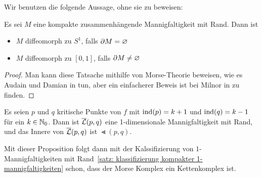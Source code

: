 Wir benutzen die folgende Aussage, ohne sie zu beweisen:

\begin{theorem}
    \label{satz: klassifizierung kompakter 1-mannigfaltigkeiten}
    Es sei $M$ eine kompakte zusammenhängende Mannigfaltigkeit mit Rand. Dann ist
    \begin{itemize}
        \item $M$ diffeomorph zu $S^1$, falls ${ \partial } M = \varnothing$
        \item $M$ diffeomorph zu $[0, 1]$, falls ${ \partial } M \neq \varnothing$
    \end{itemize}
\end{theorem}

\begin{proof}
    Man kann diese Tatsache mithilfe von Morse-Theorie beweisen, wie es Audain und Damian in 
    \cite{audin} tun, aber ein einfacherer Beweis ist bei Milnor in \cite{milnor2} zu finden.
\end{proof}

\begin{theorem}
    \label{satz: gebrochene trajektorien sind 1-dim mannigfaltigkeit}
    Es seien $p$ und $q$ kritische Punkte von $f$ mit ${ \operatorname{ind} } (p) = k + 1$ und ${ \operatorname{ind} } (q) = k - 1$
    für ein $k \in { \mathbb N }_0$. Dann ist ${\overline{\mathcal{L}} } (p, q)$ eine 1-dimensionale Mannigfaltigkeit mit Rand, und das
    Innere von ${\overline{\mathcal{L}} } (p, q)$ ist $\Lt (p, q)$.
\end{theorem}

Mit dieser Proposition folgt dann mit der Kalssifizierung von $1$-Mannigfaltigkeiten mit 
Rand~\ref{satz: klassifizierung kompakter 1-mannigfaltigkeiten} schon, dass der Morse Komplex ein
Kettenkomplex ist.

